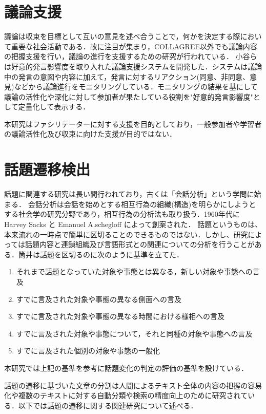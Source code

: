 \section{議論支援}
\label{rel:argSupport}
議論は収束を目標として互いの意見を述べ合うことで，何かを決定する際において重要な社会活動である．故に注目が集まり，COLLAGREE以外でも議論内容の把握支援を行い，議論の進行を支援するための研究が行われている．
小谷ら\cite{discSupport2}は好意的発言影響度を取り入れた議論支援システムを開発した．システムは議論中の発言の意図や内容に加えて，発言に対するリアクション(同意、非同意、意見)などから議論進行をモニタリングしている．モニタリングの結果を基にして議論の活性化や深化に対して参加者が果たしている役割を"好意的発言影響度"として定量化して表示する．

本研究はファシリテーターに対する支援を目的としており，一般参加者や学習者の議論活性化及び収束に向けた支援が目的ではない．
\section{話題遷移検出}
\label{rel:topic}
話題に関連する研究は長い間行われており，古くは「会話分析」という学問に始まる．
会話分析は会話を始めとする相互行為の組織(構造)を明らかにしようとする社会学の研究分野であり，相互行為の分析法も取り扱う．1960年代に Harvey Sacks と Emanuel A.schegloff によって創案された．
%
話題というものは、本来流れの一時点で簡単に区切ることのできるものではない．しかし、研究によっては話題内容と連鎖組織及び言語形式との関連についての分析を行うことがある．筒井\cite{zatsudan}は話題を区切るのに次のように基準を立てた．
\begin{enumerate}
  \item それまで話題となっていた対象や事態とは異なる，新しい対象や事態への言及\label{enum:zatsudan1}
  \item すでに言及された対象や事態の異なる側面への言及
  \item すでに言及された対象や事態の異なる時間における様相への言及
  \item すでに言及された対象や事態について，それと同種の対象や事態への言及
  \item すでに言及された個別の対象や事態の一般化\label{enum:zatsudan5}
\end{enumerate}
本研究では上記の基準を参考に話題変化の判定の評価の基準を設けている．

話題の遷移に基づいた文章の分割は人間によるテキスト全体の内容の把握の容易化や複数のテキストに対する自動分類や検索の精度向上のために研究されている．以下では話題の遷移に関する関連研究について述べる．
